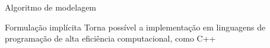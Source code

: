 \documentclass[25pt,landscape]{beamer}
\begin{document}

\begin{frame}{Algoritmo de modelagem}
    \pause
    \begin{block}{Formula\c{c}\~ao impl\'icita}
        Torna poss\'ivel a implementa\c{c}\~ao em linguagens de programa\c{c}\~ao de alta efici\^encia computacional, como C++
    \end{block}
\end{frame}
\end{document}
